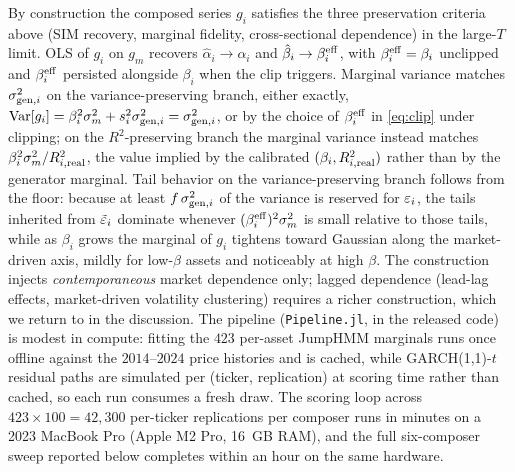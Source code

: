 By construction the composed series $g_i$ satisfies the three
preservation criteria above (SIM recovery, marginal fidelity,
cross-sectional dependence) in the large-$T$ limit.
OLS of $g_i$ on $g_m$ recovers $\hat\alpha_i \to \alpha_i$ and
$\hat\beta_i \to \beta_i^{\mathrm{eff}}$, with $\beta_i^{\mathrm{eff}} = \beta_i$
unclipped and $\beta_i^{\mathrm{eff}}$ persisted alongside $\beta_i$ when the
clip triggers. Marginal variance matches $\sigma_{\mathrm{gen},i}^2$ on the
variance-preserving branch, either exactly,
$\operatorname{Var}[g_i] = \beta_i^2 \sigma_m^2 + s_i^2 \sigma_{\mathrm{gen},i}^2
  = \sigma_{\mathrm{gen},i}^2$, or by the choice of $\beta_i^{\mathrm{eff}}$ in
\eqref{eq:clip} under clipping; on the $R^2$-preserving branch the
marginal variance instead matches
$\beta_i^2 \sigma_m^2 / R^2_{i,\mathrm{real}}$, the value implied by the
calibrated $(\beta_i, R^2_{i,\mathrm{real}})$ rather than by the generator
marginal. Tail behavior on the variance-preserving branch follows
from the floor: because at least $f\,\sigma_{\mathrm{gen},i}^2$ of the
variance is reserved for $\varepsilon_i$, the tails inherited from $\tilde{\varepsilon}_i$
dominate whenever $(\beta_i^{\mathrm{eff}})^2 \sigma_m^2$ is small relative
to those tails, while as $\beta_i$ grows the marginal of $g_i$
tightens toward Gaussian along the market-driven axis, mildly for
low-$\beta$ assets and noticeably at high $\beta$. The construction
injects \emph{contemporaneous} market dependence only; lagged
dependence (lead-lag effects, market-driven volatility clustering)
requires a richer construction, which we return to in the discussion. The pipeline (\texttt{Pipeline.jl}, in
the released code) is modest in compute: fitting the $423$ per-asset
JumpHMM marginals runs once offline against the $2014$--$2024$ price
histories and is cached, while GARCH(1,1)-$t$ residual paths are
simulated per (ticker, replication) at scoring time rather than
cached, so each run consumes a fresh draw. The scoring loop across
$423 \times 100 = 42{,}300$ per-ticker replications per composer
runs in minutes on a 2023 MacBook Pro (Apple M2 Pro, 16~GB RAM),
and the full six-composer sweep reported below completes within an
hour on the same hardware.
